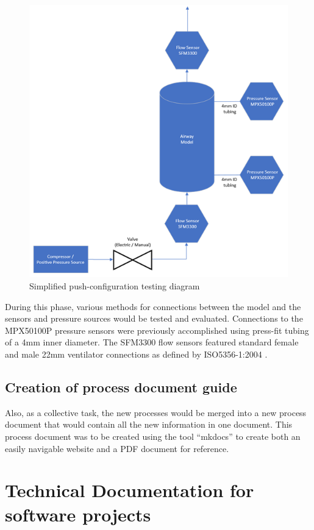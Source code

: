 \documentclass[MME,Projekt,english]{twbook}%
\begin{document}
\begin{figure}[!htbp]
	\centering
	\includegraphics[width=.8\linewidth]{images/push-setup}
	\caption{Simplified push-configuration testing diagram}\label{push-setup}
\end{figure}

During this phase, various methods for connections between the model and the sensors and pressure sources would be tested and evaluated. Connections to the MPX50100P pressure sensors \cite{mpx5010} were previously accomplished using press-fit tubing of a 4mm inner diameter. The SFM3300 flow sensors \cite{sfm3300} featured standard female and male 22mm ventilator connections as defined by ISO5356-1:2004 \cite{iso5356}.

\subsection{Creation of process document guide}

Also, as a collective task, the new processes would be merged into a new process document that would contain all the new information in one document. This process document was to be created using the tool “mkdocs” to create both an easily navigable website and a PDF document for reference.

\section{Technical Documentation for software projects}
\end{document}
